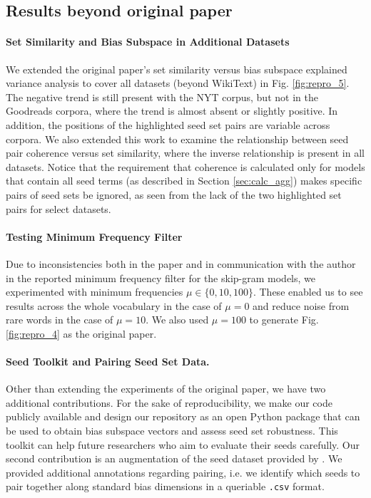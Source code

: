 \subsection{Results beyond original paper}

\paragraph{Set Similarity and Bias Subspace in Additional Datasets} We extended the original paper's
set similarity versus bias subspace explained variance analysis to cover all datasets (beyond
WikiText) in Fig. \ref{fig:repro_5}. The negative trend is still present with the NYT corpus, but
not in the Goodreads corpora, where the trend is almost absent or slightly positive. In addition,
the positions of the highlighted seed set pairs are variable across corpora. We also extended this
work to examine the relationship between seed pair coherence versus set similarity, where the
inverse relationship is present in all datasets. Notice that the requirement that coherence is
calculated only for models that contain all seed terms (as described in Section \ref{sec:calc_agg})
makes specific pairs of seed sets be ignored, as seen from the lack of the two highlighted set pairs
for select datasets.

\paragraph{Testing Minimum Frequency Filter} Due to inconsistencies both in the paper and in
communication with the author in the reported minimum frequency filter for the skip-gram models, we
experimented with minimum frequencies $\mu \in \{ 0, 10, 100\}$. These enabled us to see results
across the whole vocabulary in the case of $\mu = 0$ and reduce noise from rare words in the case of
$\mu = 10$. We also used $\mu = 100$ to generate Fig. \ref{fig:repro_4} as the original paper.

\paragraph{Seed Toolkit and Pairing Seed Set Data.} Other than extending the experiments of the
original paper, we have two additional contributions. For the sake of reproducibility, we make our
code publicly available and design our repository as an open Python package that can be used to
obtain bias subspace vectors and assess seed set robustness. This toolkit can help future
researchers who aim to evaluate their seeds carefully. Our second contribution is an augmentation of
the seed dataset provided by \citet{antoniak-mimno-2021-bad}. We provided additional annotations
regarding pairing, i.e. we identify which seeds to pair together along standard bias dimensions in
a queriable \texttt{.csv} format.

